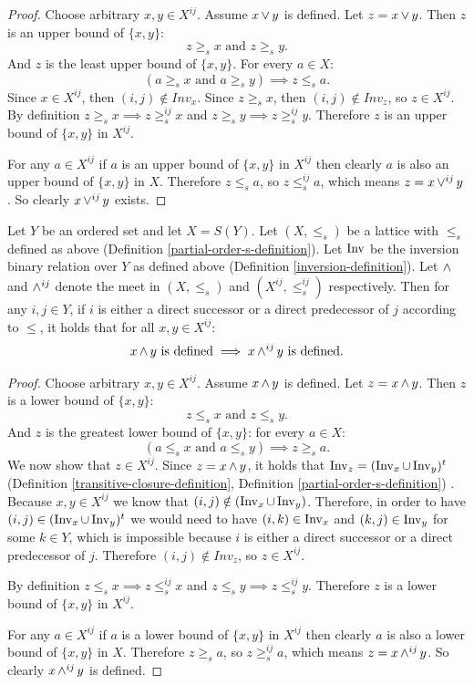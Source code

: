 	\begin{proof}
		Choose arbitrary $x, y \in X^{ij}$. Assume $x \operatorname{\vee} y$ is defined. Let $z = x \operatorname{\vee} y$. Then $z$ is an upper bound of $\{x, y\}$:
		\[
			z \ge_s x \textrm{ and } z \ge_s y.
		\]
		And $z$ is the least upper bound of $\{x, y\}$. For every $a \in X$:
		\[
			(a \ge_s x \textrm{ and } a \ge_s y) \implies z \le_s a.
		\]
		Since $x \in X^{ij}$, then $(i, j) \notin Inv_x$. Since $z \ge_s x$, then $(i, j) \notin Inv_z$, so $z \in X^{ij}$. By definition $z \ge_s x \implies z \ge^{ij}_s x$ and $z \ge_s y \implies z \ge^{ij}_s y$. Therefore $z$ is an upper bound of $\{x, y\}$ in $X^{ij}$.

		For any $a \in X^{ij}$ if $a$ is an upper bound of $\{x, y\}$ in $X^{ij}$ then clearly $a$ is also an upper bound of $\{x, y\}$ in $X$. Therefore $z \le_s a$, so $z \le^{ij}_s a$, which means $z = x \operatorname{\vee}^{ij} y$. So clearly $x \operatorname{\vee}^{ij} y$ exists.
	\end{proof}

	\begin{lemma}
		\label{identified-permutation-lattice-meet}
		Let $Y$ be an ordered set and let $X = S(Y)$. Let $(X, \le_s)$ be a lattice with $\le_s$ defined as above (Definition \ref{partial-order-s-definition}). Let $\operatorname{Inv}$ be the inversion binary relation over $Y$ as defined above (Definition \ref{inversion-definition}). Let $\operatorname{\wedge}$ and $\operatorname{\wedge}^{ij}$ denote the meet in $(X, \le_s)$ and $(X^{ij}, \le^{ij}_s)$ respectively. Then for any $i,j \in Y$, if $i$ is either a direct successor or a direct predecessor of $j$ according to $\le$, it holds that for all $x, y \in X^{ij}$:
		\[
			x \operatorname{\wedge} y \text{ is defined} \implies x \operatorname{\wedge}^{ij} y \text{ is defined}.
		\]
	\end{lemma}

	\begin{proof}
		Choose arbitrary $x, y \in X^{ij}$. Assume $x \operatorname{\wedge} y$ is defined. Let $z = x \operatorname{\wedge} y$. Then $z$ is a lower bound of $\{x, y\}$:
		\[
			z \le_s x \textrm{ and } z \le_s y.
		\]
		And $z$ is the greatest lower bound of $\{x, y\}$: for every $a \in X$:
		\[
			(a \le_s x \textrm{ and } a \le_s y) \implies z \ge_s a.
		\]
		We now show that $z \in X^{ij}$. Since $z = x \operatorname{\wedge} y$, it holds that $\operatorname{Inv}_z = (\operatorname{Inv}_x \cup \operatorname{Inv}_y)^t$ (Definition \ref{transitive-closure-definition}, Definition \ref{partial-order-s-definition}) \cite{markowsky1994permutation}. Because $x,y \in X^{ij}$ we know that $(i, j) \notin (\operatorname{Inv}_x \cup \operatorname{Inv}_y)$. Therefore, in order to have $(i, j) \in (\operatorname{Inv}_x \cup \operatorname{Inv}_y)^t$ we would need to have $(i, k) \in \operatorname{Inv}_x$ and $(k, j) \in \operatorname{Inv}_y$ for some $k \in Y$, which is impossible because $i$ is either a direct successor or a direct predecessor of $j$. Therefore $(i, j) \notin Inv_z$, so $z \in X^{ij}$.

		By definition $z \le_s x \implies z \le^{ij}_s x$ and $z \le_s y \implies z \le^{ij}_s y$. Therefore $z$ is a lower bound of $\{x, y\}$ in $X^{ij}$.

		For any $a \in X^{ij}$ if $a$ is a lower bound of $\{x, y\}$ in $X^{ij}$ then clearly $a$ is also a lower bound of $\{x, y\}$ in $X$. Therefore $z \ge_s a$, so $z \ge^{ij}_s a$, which means $z = x \operatorname{\wedge}^{ij} y$. So clearly $x \operatorname{\wedge}^{ij} y$ is defined.
	\end{proof}

